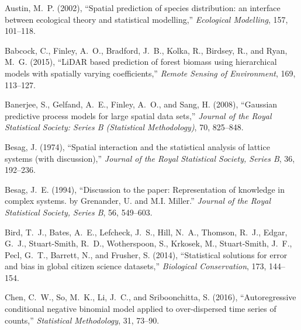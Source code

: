 \documentclass[11pt, titlepage]{article}
\begin{document}
\begin{spacing}{1.9}
\begin{flushleft}
\begin{thebibliography}{59}
Austin, M.~P. (2002), \enquote{Spatial prediction of species distribution: an
  interface between ecological theory and statistical modelling,}
  \textit{Ecological Modelling}, 157, 101--118.

Babcock, C., Finley, A.~O., Bradford, J.~B., Kolka, R., Birdsey, R., and Ryan,
  M.~G. (2015), \enquote{{LiDAR} based prediction of forest biomass using
  hierarchical models with spatially varying coefficients,} \textit{Remote
  Sensing of Environment}, 169, 113--127.

Banerjee, S., Gelfand, A.~E., Finley, A.~O., and Sang, H. (2008),
  \enquote{Gaussian predictive process models for large spatial data sets,}
  \textit{Journal of the Royal Statistical Society: Series B (Statistical
  Methodology)}, 70, 825--848.

Besag, J. (1974), \enquote{Spatial interaction and the statistical analysis of
  lattice systems (with discussion),} \textit{Journal of the Royal Statistical
  Society, Series B}, 36, 192--236.

Besag, J.~E. (1994), \enquote{Discussion to the paper: {Representation} of
  knowledge in complex systems. by {Grenander}, {U}. and {M}.{I}. {Miller}.}
  \textit{Journal of the Royal Statistical Society, Series B}, 56, 549--603.

Bird, T.~J., Bates, A.~E., Lefcheck, J.~S., Hill, N.~A., Thomson, R.~J., Edgar,
  G.~J., Stuart-Smith, R.~D., Wotherspoon, S., Krkosek, M., Stuart-Smith,
  J.~F., Pecl, G.~T., Barrett, N., and Frusher, S. (2014), \enquote{Statistical
  solutions for error and bias in global citizen science datasets,}
  \textit{Biological Conservation}, 173, 144--154.

Chen, C.~W., So, M.~K., Li, J.~C., and Sriboonchitta, S. (2016),
  \enquote{Autoregressive conditional negative binomial model applied to
  over-dispersed time series of counts,} \textit{Statistical Methodology}, 31,
  73--90.


\end{thebibliography}
\end{flushleft}
\end{spacing}
\end{document}

